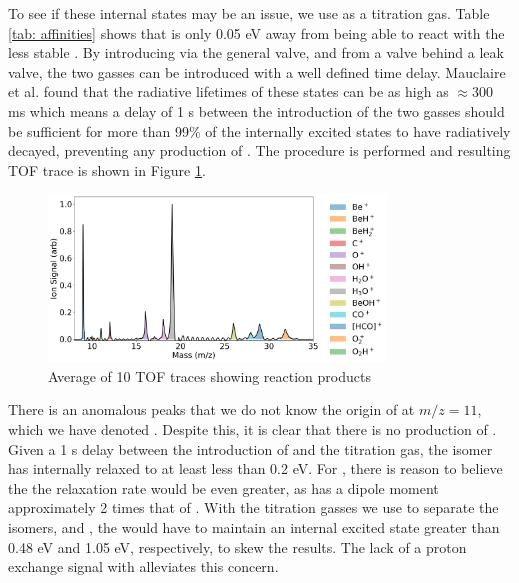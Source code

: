To see if these internal states may be an issue, we use  as a titration gas. Table \ref{tab: affinities} shows that  is only 0.05 eV away from being able to react with the less stable . By introducing  via the general valve, and  from a valve behind a leak valve, the two gasses can be introduced with a well defined time delay. Mauclaire et al. found that the radiative lifetimes of these states can be as high as $\approx 300$ ms\cite{Mauclaire1995} which means a delay of 1 s between the introduction of the two gasses should be sufficient for more than 99\% of the internally excited states to have radiatively decayed, preventing any production of . The procedure is performed and resulting TOF trace is shown in Figure \ref{fig: O2 titration}.

\begin{figure}
	\centering
	\includegraphics[width=0.8\textwidth]{images/O2_titration.png}
	\caption{Average of 10 TOF traces showing reaction products}
	\label{fig: O2 titration}
\end{figure}

There is an anomalous peaks that we do not know the origin of at $m/z=11$, which we have denoted . Despite this, it is clear that there is no production of . Given a 1 s delay between the introduction of  and the titration gas, the  isomer has internally relaxed to at least less than 0.2 eV. For , there is reason to believe the the relaxation rate would be even greater, as  has a dipole moment approximately 2 times that of .\cite{Rogers1982} With the titration gasses we use to separate the isomers,  and , the  would have to maintain an internal excited state greater than 0.48 eV and 1.05 eV, respectively, to skew the results. The lack of a proton exchange signal with  alleviates this concern.



